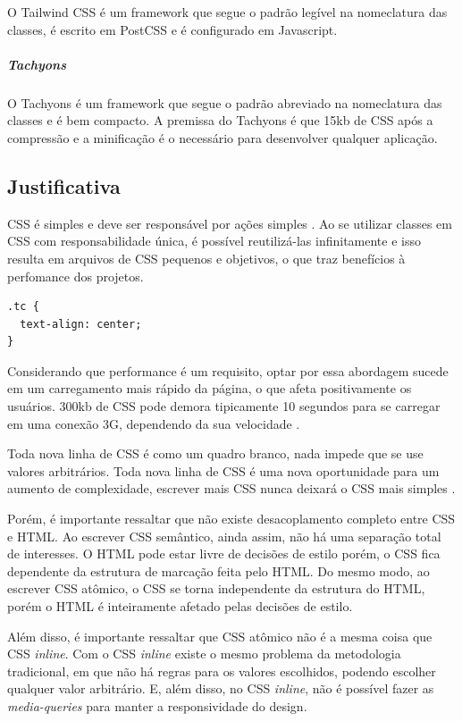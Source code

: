 O Tailwind CSS é um framework que segue o padrão legível na nomeclatura das classes, é escrito em PostCSS e é configurado em Javascript.

\hypertarget{tachyons}{%
\subparagraph{Tachyons}\label{tachyons}}

O Tachyons é um framework que segue o padrão abreviado na nomeclatura das classes e é bem compacto. A premissa do Tachyons é que 15kb de CSS após a compressão e a minificação é o necessário para desenvolver qualquer aplicação.

\hypertarget{justificativa}{%
\subsection{Justificativa}\label{justificativa}}

CSS é simples e deve ser
responsável por ações simples \cite{ardeljan}. Ao se utilizar classes em CSS com
responsabilidade única, é possível reutilizá-las infinitamente e isso
resulta em arquivos de CSS pequenos e objetivos, o que traz benefícios à perfomance
dos projetos. 

\begin{verbatim}
.tc {  
  text-align: center;  
}
\end{verbatim}

Considerando que performance é um requisito, optar por essa abordagem
sucede em um carregamento mais rápido da página, o que afeta
positivamente os usuários. 300kb de CSS pode demora tipicamente
10 segundos para se carregar em uma conexão 3G, dependendo
da sua velocidade \cite{ardeljan}.

Toda nova linha de CSS é como um quadro branco, nada impede que se use valores arbitrários. Toda nova linha de CSS é uma nova oportunidade para um aumento de complexidade, escrever mais CSS nunca deixará o CSS mais simples \cite{wathan}.

Porém, é importante ressaltar que não existe desacoplamento completo
entre CSS e HTML. Ao escrever CSS semântico, ainda assim, não há uma
separação total de interesses. O HTML pode estar livre de decisões de
estilo porém, o CSS fica dependente da estrutura de marcação feita pelo
HTML. Do mesmo modo, ao escrever CSS atômico, o CSS se torna
independente da estrutura do HTML, porém o HTML é inteiramente afetado
pelas decisões de estilo.

Além disso, é importante ressaltar que CSS atômico não é a mesma coisa que CSS \emph{inline}. Com o CSS \emph{inline} existe o mesmo problema da metodologia tradicional, em que não há regras para os valores escolhidos, podendo escolher qualquer valor arbitrário. E, além disso, no CSS \emph{inline}, não é possível fazer as \emph{media-queries} para manter a responsividade do design.

